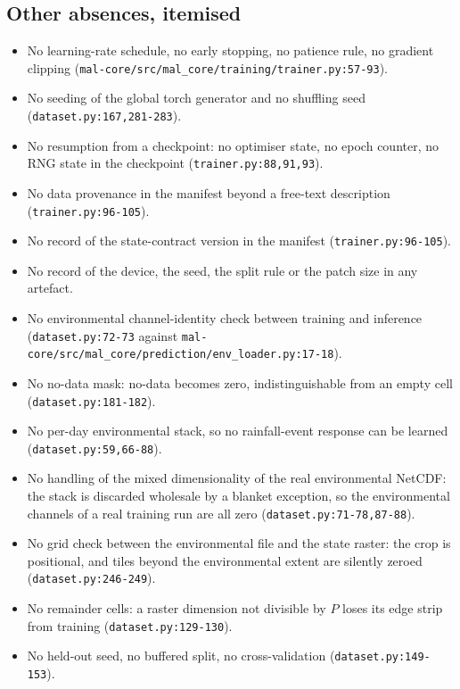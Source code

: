 \documentclass[11pt,a4paper]{article}
\newcommand{\codex}[1]{\texttt{#1}}
\begin{document}
\subsection{Other absences, itemised}

\begin{itemize}
\item No learning-rate schedule, no early stopping, no patience rule, no
      gradient clipping (\codex{mal-core/\allowbreak{}src/\allowbreak{}mal\_\allowbreak{}core/\allowbreak{}training/\allowbreak{}trainer.py:57-93}).
\item No seeding of the global torch generator and no shuffling seed
      (\codex{dataset.py:167,281-283}).
\item No resumption from a checkpoint: no optimiser state, no epoch counter,
      no RNG state in the checkpoint (\codex{trainer.py:88,91,93}).
\item No data provenance in the manifest beyond a free-text description
      (\codex{trainer.py:96-105}).
\item No record of the state-contract version in the manifest
      (\codex{trainer.py:96-105}).
\item No record of the device, the seed, the split rule or the patch size in
      any artefact.
\item No environmental channel-identity check between training and inference
      (\codex{dataset.py:72-73} against
      \codex{mal-core/\allowbreak{}src/\allowbreak{}mal\_\allowbreak{}core/\allowbreak{}prediction/\allowbreak{}env\_\allowbreak{}loader.py:17-18}).
\item No no-data mask: no-data becomes zero, indistinguishable from an empty
      cell (\codex{dataset.py:181-182}).
\item No per-day environmental stack, so no rainfall-event response can be
      learned (\codex{dataset.py:59,66-88}).
\item No handling of the mixed dimensionality of the real environmental
      NetCDF: the stack is discarded wholesale by a blanket exception, so the
      environmental channels of a real training run are all zero
      (\codex{dataset.py:71-78,87-88}).
\item No grid check between the environmental file and the state raster: the
      crop is positional, and tiles beyond the environmental extent are
      silently zeroed (\codex{dataset.py:246-249}).
\item No remainder cells: a raster dimension not divisible by \(P\) loses its
      edge strip from training (\codex{dataset.py:129-130}).
\item No held-out seed, no buffered split, no cross-validation
      (\codex{dataset.py:149-153}).
\end{itemize}
\end{document}
